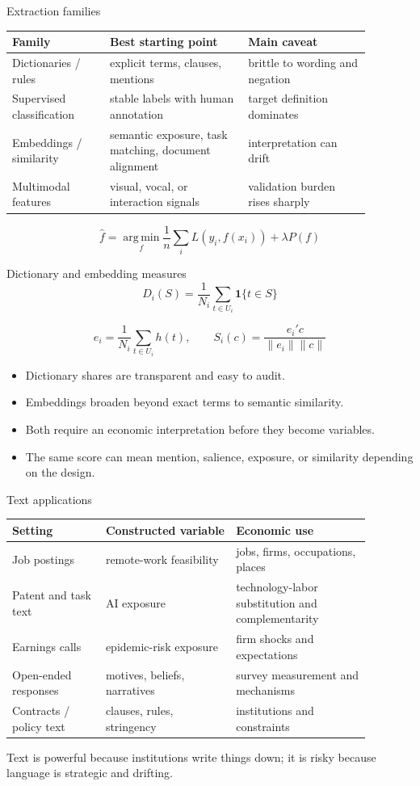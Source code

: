 \documentclass[aspectratio=169,11pt]{beamer}
\newcommand{\1}{\mathbf{1}}
\newcommand{\argmin}{\operatorname*{arg\,min}}
\begin{document}
\begin{frame}{Extraction families}
\small
\begin{tabular}{p{0.24\linewidth} p{0.34\linewidth} p{0.30\linewidth}}
\toprule
Family & Best starting point & Main caveat \\
\midrule
Dictionaries / rules & explicit terms, clauses, mentions & brittle to wording and negation \\
Supervised classification & stable labels with human annotation & target definition dominates \\
Embeddings / similarity & semantic exposure, task matching, document alignment & interpretation can drift \\
Multimodal features & visual, vocal, or interaction signals & validation burden rises sharply \\
\bottomrule
\end{tabular}

\medskip
\[
\widehat f
=
\argmin_f
\frac{1}{n}\sum_i L(y_i,f(x_i))+\lambda P(f)
\]
\end{frame}

\begin{frame}{Dictionary and embedding measures}
\small
\[
D_i(S)=\frac{1}{N_i}\sum_{t\in U_i}\1\{t\in S\}
\]

\[
e_i=\frac{1}{N_i}\sum_{t\in U_i}h(t),
\qquad
S_i(c)=\frac{e_i'c}{\|e_i\|\|c\|}
\]

\begin{itemize}
    \item Dictionary shares are transparent and easy to audit.
    \item Embeddings broaden beyond exact terms to semantic similarity.
    \item Both require an economic interpretation before they become variables.
    \item The same score can mean mention, salience, exposure, or similarity depending on the design.
\end{itemize}
\end{frame}

\begin{frame}{Text applications}
\small
\begin{tabular}{p{0.23\linewidth} p{0.32\linewidth} p{0.33\linewidth}}
\toprule
Setting & Constructed variable & Economic use \\
\midrule
Job postings & remote-work feasibility & jobs, firms, occupations, places \\
Patent and task text & AI exposure & technology-labor substitution and complementarity \\
Earnings calls & epidemic-risk exposure & firm shocks and expectations \\
Open-ended responses & motives, beliefs, narratives & survey measurement and mechanisms \\
Contracts / policy text & clauses, rules, stringency & institutions and constraints \\
\bottomrule
\end{tabular}

\medskip
Text is powerful because institutions write things down; it is risky because language is strategic and drifting.
\end{frame}
\end{document}
